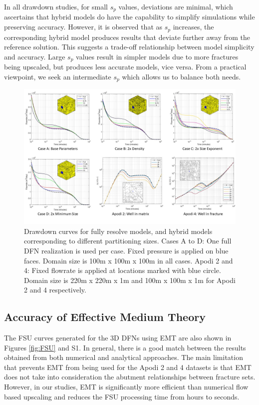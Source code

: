\documentclass[draft]{agujournal2018}
\begin{document}
In all drawdown studies, for small $s_p$ values, deviations are minimal, which ascertains that hybrid models do have the capability to simplify simulations while preserving accuracy. However, it is observed that as $s_p$ increases, the corresponding hybrid model produces results that deviate further away from the reference solution. This suggests a trade-off relationship between model simplicity and accuracy. Large $s_p$ values result in simpler models due to more fractures being upscaled, but produces less accurate models, vice versa. From a practical viewpoint, we seek an intermediate $s_p$ which allows us to balance both needs. 

\begin{figure}[h]
	\centering
	
	\includegraphics[width=\textwidth]{DD_main/DD_main.jpg}
	
	\caption{Drawdown curves for fully resolve models, and hybrid models corresponding to different partitioning sizes. Cases A to D: One full DFN realization is used per case. Fixed pressure is applied on blue faces. Domain size is 100m x 100m x 100m in all cases. Apodi 2 and 4: Fixed flowrate is applied at locations marked with blue circle. Domain size is 220m x 220m x 1m and 100m x 100m x 1m for Apodi 2 and 4 respectively.}
	\label{fig:DD}
\end{figure}

\subsection{Accuracy of Effective Medium Theory}
The FSU curves generated for the 3D DFNs using EMT are also shown in Figures \ref{fig:FSU} and S1. In general, there is a good match between the results obtained from both numerical and analytical approaches. The main limitation that prevents EMT from being used for the Apodi 2 and 4 datasets is that EMT does not take into consideration the abutment relationships between fracture sets. However, in our studies, EMT is significantly more efficient than numerical flow based upscaling and reduces the FSU processing time from hours to seconds.
\end{document}
